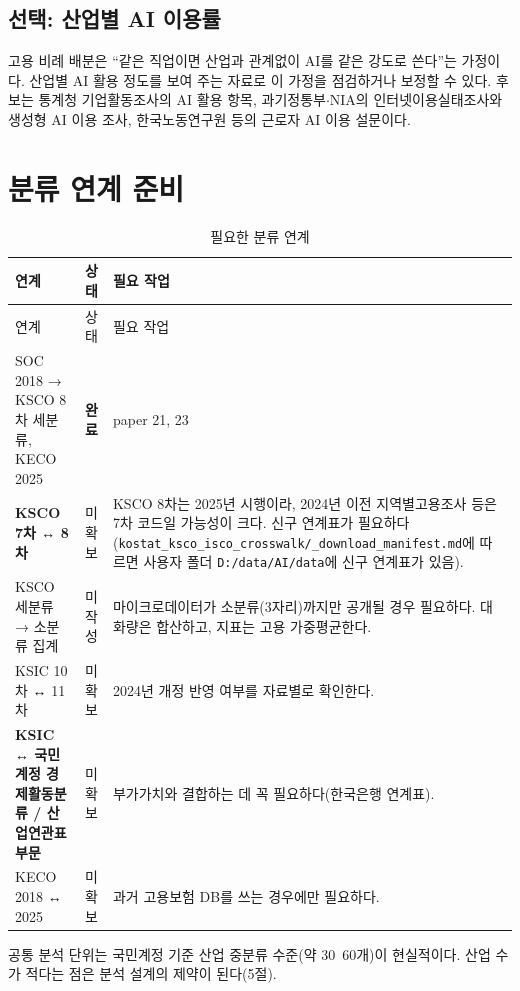 \documentclass[11pt]{article}
\begin{document}
\subsection{선택: 산업별 AI 이용률}

고용 비례 배분은 ``같은 직업이면 산업과 관계없이 AI를 같은 강도로 쓴다''는 가정이다. 산업별 AI 활용 정도를 보여 주는 자료로 이 가정을 점검하거나 보정할 수 있다. 후보는 통계청 기업활동조사의 AI 활용 항목, 과기정통부$\cdot$NIA의 인터넷이용실태조사와 생성형 AI 이용 조사, 한국노동연구원 등의 근로자 AI 이용 설문이다.

\section{분류 연계 준비}

\begin{longtable}{L{3.8cm}L{2.0cm}L{10.2cm}}
\caption{필요한 분류 연계}\label{tab:cw}\\
\toprule
연계 & 상태 & 필요 작업 \\
\midrule
\endfirsthead
\toprule
연계 & 상태 & 필요 작업 \\
\midrule
\endhead
SOC 2018 → KSCO 8차 세분류, KECO 2025 & \textbf{완료} & paper 21, 23 \\
\textbf{KSCO 7차 ↔ 8차} & 미확보 & KSCO 8차는 2025년 시행이라, 2024년 이전 지역별고용조사 등은 7차 코드일 가능성이 크다. 신구 연계표가 필요하다(\texttt{kostat\_ksco\_isco\_crosswalk/\_download\_manifest.md}에 따르면 사용자 폴더 \texttt{D:/data/AI/data}에 신구 연계표가 있음). \\
KSCO 세분류 → 소분류 집계 & 미작성 & 마이크로데이터가 소분류(3자리)까지만 공개될 경우 필요하다. 대화량은 합산하고, 지표는 고용 가중평균한다. \\
KSIC 10차 ↔ 11차 & 미확보 & 2024년 개정 반영 여부를 자료별로 확인한다. \\
\textbf{KSIC ↔ 국민계정 경제활동분류 / 산업연관표 부문} & 미확보 & 부가가치와 결합하는 데 꼭 필요하다(한국은행 연계표). \\
KECO 2018 ↔ 2025 & 미확보 & 과거 고용보험 DB를 쓰는 경우에만 필요하다. \\
\bottomrule
\end{longtable}

\noindent 공통 분석 단위는 국민계정 기준 산업 중분류 수준(약 30~60개)이 현실적이다. 산업 수가 적다는 점은 분석 설계의 제약이 된다(5절).

\end{document}

